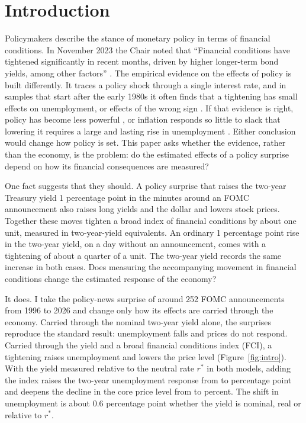 \documentclass[11pt]{article}
\newcommand{\rs}{r^{*}}
\begin{document}
\section{Introduction}
\label{sec:intro}
Policymakers describe the stance of monetary policy in terms of financial conditions. In November 2023 the Chair noted that ``Financial conditions have tightened significantly in recent months, driven by higher longer-term bond yields, among other factors'' \citep{powell2023}. The empirical evidence on the effects of policy is built differently. It traces a policy shock through a single interest rate, and in samples that start after the early 1980s it often finds that a tightening has small effects on unemployment, or effects of the wrong sign \citep{ramey2016}. If that evidence is right, policy has become less powerful \citep{boivin2006,boivin2010}, or inflation responds so little to slack that lowering it requires a large and lasting rise in unemployment \citep{hazell2022,delnegro2020}. Either conclusion would change how policy is set. This paper asks whether the evidence, rather than the economy, is the problem: do the estimated effects of a policy surprise depend on how its financial consequences are measured?

One fact suggests that they should. A policy surprise that raises the two-year Treasury yield 1 percentage point in the minutes around an FOMC announcement also raises long yields and the dollar and lowers stock prices. Together these moves tighten a broad index of financial conditions by about one unit, measured in two-year-yield equivalents. An ordinary 1 percentage point rise in the two-year yield, on a day without an announcement, comes with a tightening of about a quarter of a unit. The two-year yield records the same increase in both cases. Does measuring the accompanying movement in financial conditions change the estimated response of the economy?

It does. I take the policy-news surprise of \citet{nakamura2018} around 252 FOMC announcements from 1996 to 2026 and change only how its effects are carried through the economy. Carried through the nominal two-year yield alone, the surprises reproduce the standard result: unemployment falls and prices do not respond. Carried through the yield and a broad financial conditions index (FCI), a tightening raises unemployment and lowers the price level (Figure~\ref{fig:intro}). With the yield measured relative to the neutral rate $\rs$ in both models, adding the index raises the two-year unemployment response from  to  percentage point and deepens the decline in the core price level from  to  percent. The shift in unemployment is about 0.6 percentage point whether the yield is nominal, real or relative to $\rs$.
\end{document}
